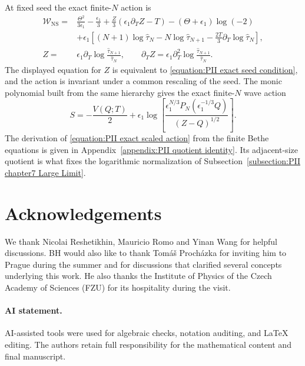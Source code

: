 \documentclass[a4paper,11pt]{article}
\numberwithin{equation}{section}
\begin{document}
At fixed seed the exact finite-$N$ action is
\begin{equation}
\label{equation:PII exact scaled action}
\begin{aligned}
\mathcal{W}_{\mathrm{NS}}
={}&\frac{\Theta^{2}}{3\epsilon_{1}}-\frac{\epsilon_{1}}{3}
+\frac{Z}{3}\left(\epsilon_{1}\partial_{T}Z-T\right)
-(\Theta+\epsilon_{1})\log{(-2)}\\
&+\epsilon_{1}\left[
(N+1)\log{\widehat{\tau}_{N}}
-N\log{\widehat{\tau}_{N+1}}
-\frac{2T}{3}\partial_{T}\log{\widehat{\tau}_{N}}\right],
\\
Z={}&\epsilon_{1}\partial_{T}
\log{\frac{\widehat{\tau}_{N+1}}{\widehat{\tau}_{N}}},
\qquad
\partial_{T}Z=\epsilon_{1}\partial_{T}^{2}
\log{\frac{\widehat{\tau}_{N+1}}{\widehat{\tau}_{N}}}.
\end{aligned}
\end{equation}
The displayed equation for $Z$ is equivalent to
\eqref{equation:PII exact seed condition}, and the action is
invariant under a common rescaling of the seed.  The monic
polynomial built from the same hierarchy gives the exact
finite-$N$ wave action
\begin{equation}
\label{equation:PII exact wave action}
S=-\frac{V(Q;T)}{2}
+\epsilon_{1}\log{\left[
\frac{\epsilon_{1}^{N/3}
P_{N}(\epsilon_{1}^{-1/3}Q)}{(Z-Q)^{1/2}}\right]}.
\end{equation}
The derivation of \eqref{equation:PII exact scaled action} from the
finite Bethe equations is given in
Appendix~\ref{appendix:PII quotient identity}.  Its adjacent-size
quotient is what fixes the logarithmic normalization of
Subsection~\ref{subsection:PII chapter7 Large Limit}.

\section*{Acknowledgements}
We thank Nicolai Reshetikhin, Mauricio Romo and Yinan Wang for helpful
discussions. BH would also like to thank Tom\'a\v{s} Proch\'azka for inviting him to
Prague during the summer and for discussions that clarified several
concepts underlying this work. He also thanks the Institute of Physics
of the Czech Academy of Sciences (FZU) for its hospitality during the
visit.

\paragraph{AI statement.}
AI-assisted tools were used for algebraic checks, notation auditing,
and LaTeX editing. The authors retain full responsibility for the
mathematical content and final manuscript.
\end{document}
